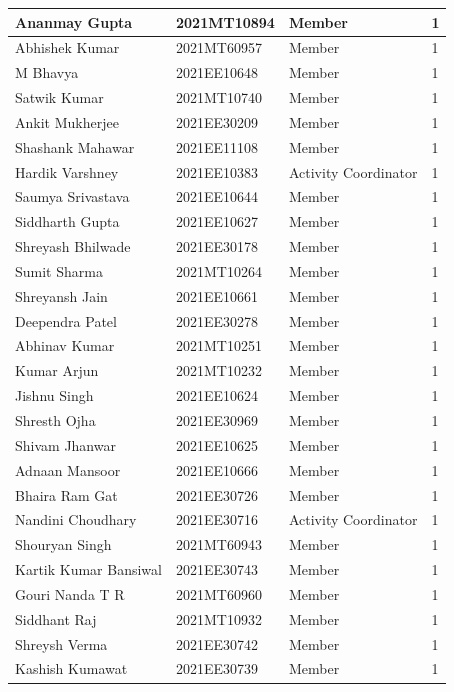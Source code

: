 \documentclass[12pt]{article}
\begin{document}
\begin{longtable}{|P{3.8cm}|P{2.95cm}|P{4cm}|P{1.2cm}|}
  \hline
  Ananmay Gupta & 2021MT10894 & Member & 1 \\
  \hline
  Abhishek Kumar & 2021MT60957 & Member & 1 \\
  \hline
  M Bhavya & 2021EE10648 & Member & 1 \\
  \hline
  Satwik Kumar & 2021MT10740 & Member & 1 \\
  \hline
  Ankit Mukherjee & 2021EE30209 & Member & 1 \\
  \hline
  Shashank Mahawar & 2021EE11108 & Member & 1 \\
  \hline
  Hardik Varshney & 2021EE10383 & Activity Coordinator & 1 \\
  \hline
  Saumya Srivastava & 2021EE10644 & Member & 1 \\
  \hline
  Siddharth Gupta & 2021EE10627 & Member & 1 \\
  \hline
  Shreyash Bhilwade & 2021EE30178 & Member & 1 \\
  \hline
  Sumit Sharma & 2021MT10264 & Member & 1 \\
  \hline
  Shreyansh Jain & 2021EE10661 & Member & 1 \\
  \hline
  Deependra Patel & 2021EE30278 & Member & 1 \\
  \hline
  Abhinav Kumar & 2021MT10251 & Member & 1 \\
  \hline
  Kumar Arjun & 2021MT10232 & Member & 1 \\
  \hline
  Jishnu Singh & 2021EE10624 & Member & 1 \\
  \hline
  Shresth Ojha & 2021EE30969 & Member & 1 \\
  \hline
  Shivam Jhanwar & 2021EE10625 & Member & 1 \\
  \hline
  Adnaan Mansoor & 2021EE10666 & Member & 1 \\
  \hline
  Bhaira Ram Gat & 2021EE30726 & Member & 1 \\
  \hline
  Nandini Choudhary & 2021EE30716 & Activity Coordinator & 1 \\
  \hline
  Shouryan Singh & 2021MT60943 & Member & 1 \\
  \hline
  Kartik Kumar Bansiwal & 2021EE30743 & Member & 1 \\
  \hline
  Gouri Nanda T R & 2021MT60960 & Member & 1 \\
  \hline
  Siddhant Raj & 2021MT10932 & Member & 1 \\
  \hline
  Shreysh Verma & 2021EE30742 & Member & 1 \\
  \hline
  Kashish Kumawat & 2021EE30739 & Member & 1 \\

\end{longtable}
\end{document}
